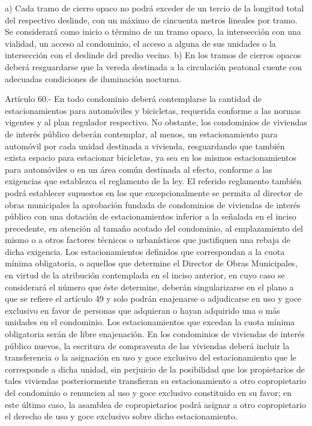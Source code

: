     a) Cada tramo de cierro opaco no podrá exceder de un tercio de la longitud total del respectivo deslinde, con un máximo de cincuenta metros lineales por tramo. Se considerará como inicio o término de un tramo opaco, la intersección con una vialidad, un acceso al condominio, el acceso a alguna de sus unidades o la intersección con el deslinde del predio vecino.
    b) En los tramos de cierros opacos deberá resguardarse que la vereda destinada a la circulación peatonal cuente con adecuadas condiciones de iluminación nocturna.
   
    Artículo 60.- En todo condominio deberá contemplarse la cantidad de estacionamientos para automóviles y bicicletas, requerida conforme a las normas vigentes y al plan regulador respectivo. No obstante, los condominios de viviendas de interés público deberán contemplar, al menos, un estacionamiento para automóvil por cada unidad destinada a vivienda, resguardando que también exista espacio para estacionar bicicletas, ya sea en los mismos estacionamientos para automóviles o en un área común destinada al efecto, conforme a las exigencias que establezca el reglamento de la ley.
    El referido reglamento también podrá establecer supuestos en los que excepcionalmente se permita al director de obras municipales la aprobación fundada de condominios de viviendas de interés público con una dotación de estacionamientos inferior a la señalada en el inciso precedente, en atención al tamaño acotado del condominio, al emplazamiento del mismo o a otros factores técnicos o urbanísticos que justifiquen una rebaja de dicha exigencia.
    Los estacionamientos definidos que correspondan a la cuota mínima obligatoria, o aquellos que determine el Director de Obras Municipales, en virtud de la atribución contemplada en el inciso anterior, en cuyo caso se considerará el número que éste determine, deberán singularizarse en el plano a que se refiere el artículo 49 y solo podrán enajenarse o adjudicarse en uso y goce exclusivo en favor de personas que adquieran o hayan adquirido una o más unidades en el condominio. Los estacionamientos que excedan la cuota mínima obligatoria serán de libre enajenación.
    En los condominios de viviendas de interés público nuevos, la escritura de compraventa de las viviendas deberá incluir la transferencia o la asignación en uso y goce exclusivo del estacionamiento que le corresponde a dicha unidad, sin perjuicio de la posibilidad que los propietarios de tales viviendas posteriormente transfieran su estacionamiento a otro copropietario del condominio o renuncien al uso y goce exclusivo constituido en su favor; en este último caso, la asamblea de copropietarios podrá asignar a otro copropietario el derecho de uso y goce exclusivo sobre dicho estacionamiento.
